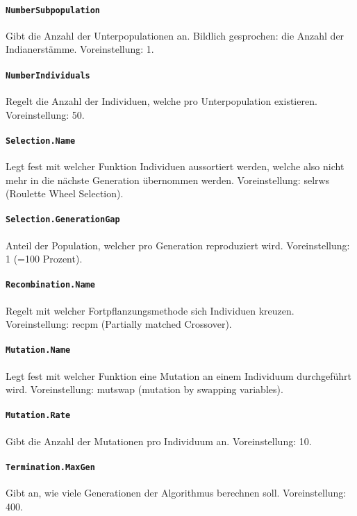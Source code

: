 \paragraph{{\tt NumberSubpopulation}} Gibt die Anzahl der Unterpopulationen an.
Bildlich gesprochen: die Anzahl der Indianerstämme.
Voreinstellung: 1.

\paragraph{{\tt NumberIndividuals}} Regelt die Anzahl
der Individuen, welche pro Unterpopulation existieren.
Voreinstellung: 50.

\paragraph{{\tt Selection.Name}} Legt fest mit welcher Funktion Individuen
aussortiert werden, welche also nicht mehr in die nächste Generation
übernommen werden.
Voreinstellung: selrws (Roulette Wheel Selection).

\paragraph{{\tt Selection.GenerationGap}} Anteil der Population, welcher pro
Generation reproduziert wird.
Voreinstellung: 1 (=100 Prozent).

\paragraph{{\tt Recombination.Name}} Regelt mit welcher Fortpflanzungsmethode
sich Individuen kreuzen.
Voreinstellung: recpm (Partially matched Crossover).

\paragraph{{\tt Mutation.Name}} Legt fest mit welcher Funktion eine Mutation
an einem Individuum durchgeführt wird.
Voreinstellung: mutswap (mutation by swapping variables).

\paragraph{{\tt Mutation.Rate}} Gibt die Anzahl der Mutationen
pro Individuum an.
Voreinstellung: 10.

\paragraph{{\tt Termination.MaxGen}} Gibt an, wie viele Generationen der
Algorithmus berechnen soll.
Voreinstellung: 400.

